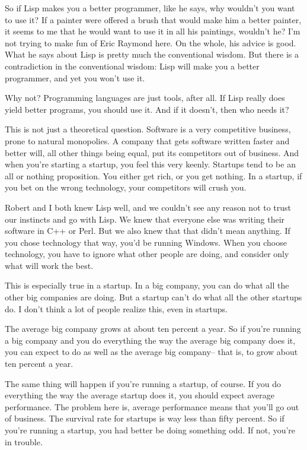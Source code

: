 So if Lisp makes you a better programmer, like he says, why wouldn't you
want to use it? If a painter were offered a brush that would make him a
better painter, it seems to me that he would want to use it in all his
paintings, wouldn't he? I'm not trying to make fun of Eric Raymond here.
On the whole, his advice is good. What he says about Lisp is pretty much
the conventional wisdom. But there is a contradiction in the
conventional wisdom: Lisp will make you a better programmer, and yet you
won't use it.

Why not? Programming languages are just tools, after all. If Lisp really
does yield better programs, you should use it. And if it doesn't, then
who needs it?

This is not just a theoretical question. Software is a very competitive
business, prone to natural monopolies. A company that gets software
written faster and better will, all other things being equal, put its
competitors out of business. And when you're starting a startup, you
feel this very keenly. Startups tend to be an all or nothing
proposition. You either get rich, or you get nothing. In a startup, if
you bet on the wrong technology, your competitors will crush you.

Robert and I both knew Lisp well, and we couldn't see any reason not to
trust our instincts and go with Lisp. We knew that everyone else was
writing their software in C++ or Perl. But we also knew that that didn't
mean anything. If you chose technology that way, you'd be running
Windows. When you choose technology, you have to ignore what other
people are doing, and consider only what will work the best.

This is especially true in a startup. In a big company, you can do what
all the other big companies are doing. But a startup can't do what all
the other startups do. I don't think a lot of people realize this, even
in startups.

The average big company grows at about ten percent a year. So if you're
running a big company and you do everything the way the average big
company does it, you can expect to do as well as the average big
company-- that is, to grow about ten percent a year.

The same thing will happen if you're running a startup, of course. If
you do everything the way the average startup does it, you should expect
average performance. The problem here is, average performance means that
you'll go out of business. The survival rate for startups is way less
than fifty percent. So if you're running a startup, you had better be
doing something odd. If not, you're in trouble.

